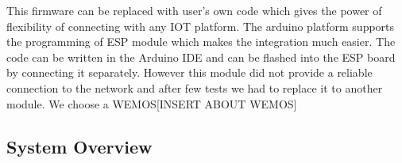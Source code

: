  This firmware can be replaced with user's own code which gives the power of flexibility of connecting with any IOT platform. The arduino platform supports the programming of ESP module which makes the integration much easier. The code can be written in the Arduino IDE and can be flashed into the ESP board by connecting it separately.  However this module did not provide a reliable connection to the network and after few tests we had to replace it to another module. We choose a WEMOS[INSERT ABOUT WEMOS]
 

 \subsection{System Overview}


